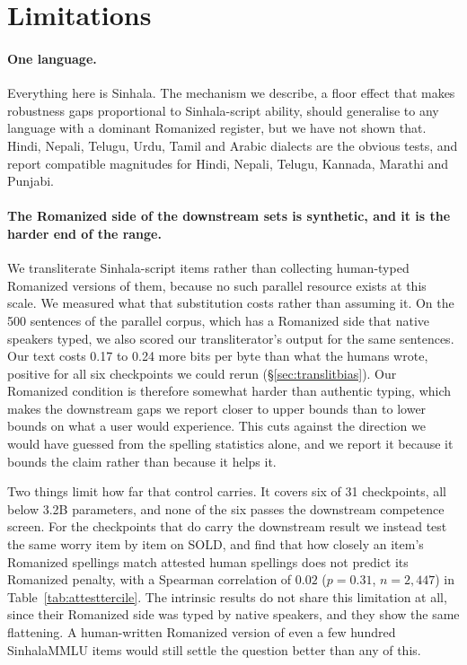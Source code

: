 \documentclass[11pt]{article}
\begin{document}
\section*{Limitations}

\paragraph{One language.} Everything here is Sinhala. The mechanism we describe,
a floor effect that makes robustness gaps proportional to Sinhala-script ability,
should generalise to any language with a dominant Romanized register, but we have
not shown that. Hindi, Nepali, Telugu, Urdu, Tamil and Arabic dialects are the
obvious tests, and \citet{khullar-etal-2025-scriptgap} report compatible
magnitudes for Hindi, Nepali, Telugu, Kannada, Marathi and Punjabi.

\paragraph{The Romanized side of the downstream sets is synthetic, and it is the
harder end of the range.} We transliterate Sinhala-script items rather than
collecting human-typed Romanized versions of them, because no such parallel
resource exists at this scale. We measured what that substitution costs rather
than assuming it. On the 500 sentences of the parallel corpus, which has a
Romanized side that native speakers typed, we also scored our transliterator's
output for the same sentences. Our text costs 0.17 to 0.24 more bits per byte
than what the humans wrote, positive for all six checkpoints we could rerun
(\S\ref{sec:translitbias}). Our Romanized condition is therefore somewhat harder
than authentic typing, which makes the downstream gaps we report closer to upper
bounds than to lower bounds on what a user would experience. This cuts against
the direction we would have guessed from the spelling statistics alone, and we
report it because it bounds the claim rather than because it helps it.

Two things limit how far that control carries. It covers six of 31 checkpoints,
all below 3.2B parameters, and none of the six passes the downstream competence
screen. For the checkpoints that do carry the downstream result we instead test
the same worry item by item on SOLD, and find that how closely an item's
Romanized spellings match attested human spellings does not predict its
Romanized penalty, with a Spearman correlation of $0.02$ ($p = 0.31$,
$n = 2{,}447$) in Table~\ref{tab:attesttercile}. The intrinsic results do not share this
limitation at all, since their Romanized side was typed by native speakers, and
they show the same flattening. A human-written Romanized version of even a few
hundred SinhalaMMLU items would still settle the question better than any of
this.
\end{document}
